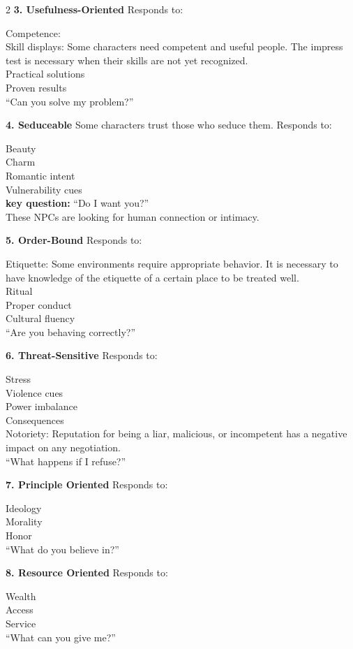 \begin{multicols}{2}
\textbf{3. Usefulness-Oriented}
Responds to:

Competence: \\
Skill displays: Some characters need competent and useful people. The impress test is necessary when their skills are not yet recognized. \\
Practical solutions \\
Proven results \\
“Can you solve my problem?”

\textbf{4. Seduceable}
Some characters trust those who seduce them.
Responds to:

Beauty \\
Charm \\
Romantic intent \\
Vulnerability cues \\
\textbf{key question:} “Do I want you?” \\
These NPCs are looking for human connection or intimacy. 

\textbf{5. Order-Bound}
Responds to:

Etiquette: Some environments require appropriate behavior. It is necessary to have knowledge of the etiquette of a certain place to be treated well. \\
Ritual \\
Proper conduct \\
Cultural fluency \\
“Are you behaving correctly?”

\textbf{6. Threat-Sensitive}
Responds to:

Stress \\
Violence cues \\
Power imbalance \\
Consequences \\
Notoriety: Reputation for being a liar, malicious, or incompetent has a negative impact on any negotiation. \\
“What happens if I refuse?”

\textbf{7. Principle Oriented}
Responds to:

Ideology \\
Morality \\
Honor \\
“What do you believe in?”

\textbf{8. Resource Oriented}
Responds to:

Wealth \\
Access \\
Service \\
“What can you give me?”


\end{multicols}
